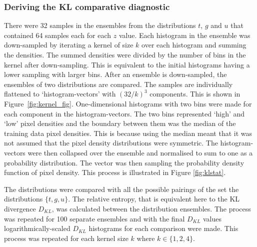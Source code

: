 \documentclass[twocolumn]{article}
\numberwithin{equation}{section}
\begin{document}

\subsubsection{Deriving the KL comparative diagnostic}
There were 32 samples in the ensembles from the distributions $t$, $g$ and $u$ that contained 64 samples each for each $z$ 
value. Each histogram in the ensemble was down-sampled by iterating a kernel of size $k$ over each histogram and summing 
the densities. The summed densities were divided by the number of bins in the kernel after down-sampling. This is equivalent 
to the initial histograms having a lower sampling with larger bins. After an ensemble is down-sampled, the ensembles of two 
distributions are compared. The samples are individually flattened to `histogram-vectors' with $(32/k)^3$ components. 
This is shown in Figure~\ref{fig:kernel_fig}. One-dimensional histograms with two bins were made for each component in the 
histogram-vectors. The two bins represented `high' and `low' pixel densities and the boundary between them was the median 
of the training data pixel densities. This is because using the median meant that it was not assumed that the pixel density 
distributions were symmetric. The histogram-vectors were then collapsed over the ensemble and normalised to sum to one as 
a probability distribution. The vector was then sampling the probability density function of pixel density. This process 
is illustrated in Figure \ref{fig:klstat}.

The distributions were compared with all the possible pairings of the set the distributions $\{ t, g, u\}$. The relative 
entropy, that is equivalent here to the KL divergence $D_{KL}$, was calculated between the distribution ensembles. The 
process was repeated for 100 separate ensembles and with the final $D_{KL}$ values logarithmically-scaled $D_{KL}$ 
histograms for each comparison were made. This process was repeated for each kernel size $k$ where $k \in \{1, 2, 4\}$.

\end{document}
